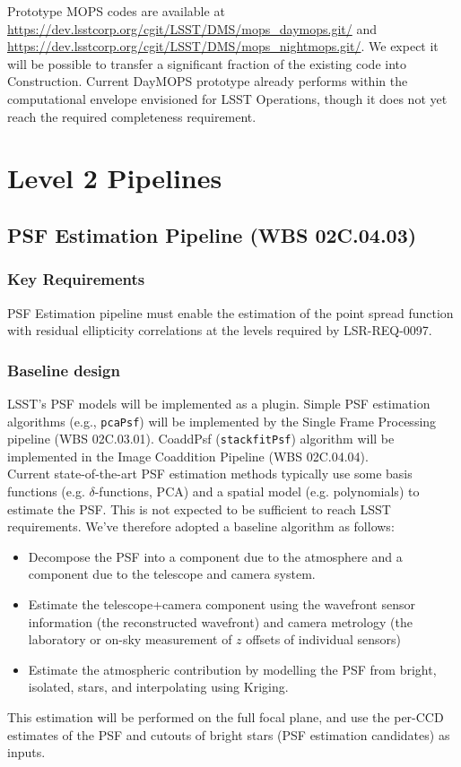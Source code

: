 \documentclass[12pt]{article}
\newcommand{\wbsSFM}{WBS 02C.03.01}
\newcommand{\wbsPSF}{WBS 02C.04.03}
\newcommand{\wbsCoadd}{WBS 02C.04.04}
\begin{document}
Prototype MOPS codes are available at \url{https://dev.lsstcorp.org/cgit/LSST/DMS/mops_daymops.git/} and \url{https://dev.lsstcorp.org/cgit/LSST/DMS/mops_nightmops.git/}. We expect it will be possible to transfer a significant fraction of the existing code into Construction. Current DayMOPS prototype already performs within the computational envelope envisioned for LSST Operations, though it does not yet reach the required completeness requirement.

\clearpage

\section{Level 2 Pipelines}

\subsection{PSF Estimation Pipeline (\wbsPSF)}

\subsubsection{Key Requirements}

PSF Estimation pipeline must enable the estimation of the point spread function with residual ellipticity correlations at the levels required by LSR-REQ-0097.

\subsubsection{Baseline design}

LSST's PSF models will be implemented as a plugin. Simple PSF estimation algorithms (e.g., {\tt pcaPsf}) will be implemented by the Single Frame Processing pipeline (\wbsSFM). CoaddPsf ({\tt stackfitPsf}) algorithm will be implemented in the Image Coaddition Pipeline (\wbsCoadd).
\\

Current state-of-the-art PSF estimation methods typically use some basis functions (e.g. $\delta$-functions, PCA) and a spatial model (e.g. polynomials) to estimate the PSF. This is not expected to be sufficient to reach LSST requirements. We've therefore adopted a baseline algorithm as follows:
\begin{itemize}
    \item Decompose the PSF into a component due to the atmosphere and a component due to the telescope and camera system.
    \item Estimate the telescope+camera component using the wavefront sensor information (the reconstructed wavefront) and camera metrology (the laboratory or on-sky measurement of $z$ offsets of individual sensors)
    \item Estimate the atmospheric contribution by modelling the PSF from bright, isolated, stars, and interpolating using Kriging. %
\end{itemize}
This estimation will be performed on the full focal plane, and use the per-CCD estimates of the PSF and cutouts of bright stars (PSF estimation candidates) as inputs.
\\
\end{document}
